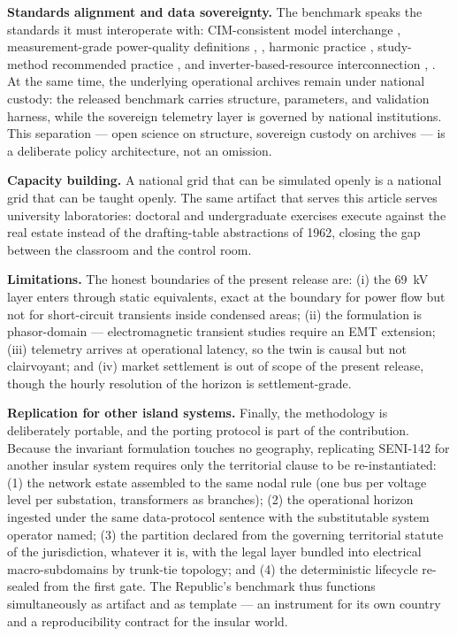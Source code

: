 \textbf{Standards alignment and data sovereignty.} The benchmark speaks the standards it must interoperate with: CIM-consistent model interchange \cite{iec61970}, measurement-grade power-quality definitions \cite{iec61000}, \cite{ieee1459}, harmonic practice \cite{ieee519}, study-method recommended practice \cite{ieee399}, and inverter-based-resource interconnection \cite{ieee2800}, \cite{ieee1547}. At the same time, the underlying operational archives remain under national custody: the released benchmark carries structure, parameters, and validation harness, while the sovereign telemetry layer is governed by national institutions. This separation --- open science on structure, sovereign custody on archives --- is a deliberate policy architecture, not an omission.

\textbf{Capacity building.} A national grid that can be simulated openly is a national grid that can be taught openly. The same artifact that serves this article serves university laboratories: doctoral and undergraduate exercises execute against the real estate instead of the drafting-table abstractions of 1962, closing the gap between the classroom and the control room.

\textbf{Limitations.} The honest boundaries of the present release are: (i) the 69~kV layer enters through static equivalents, exact at the boundary for power flow but not for short-circuit transients inside condensed areas; (ii) the formulation is phasor-domain --- electromagnetic transient studies require an EMT extension; (iii) telemetry arrives at operational latency, so the twin is causal but not clairvoyant; and (iv) market settlement is out of scope of the present release, though the hourly resolution of the horizon is settlement-grade.

\textbf{Replication for other island systems.} Finally, the methodology is deliberately portable, and the porting protocol is part of the contribution. Because the invariant formulation touches no geography, replicating SENI-142 for another insular system requires only the territorial clause to be re-instantiated: (1) the network estate assembled to the same nodal rule (one bus per voltage level per substation, transformers as branches); (2) the operational horizon ingested under the same data-protocol sentence with the substitutable system operator named; (3) the partition declared from the governing territorial statute of the jurisdiction, whatever it is, with the legal layer bundled into electrical macro-subdomains by trunk-tie topology; and (4) the deterministic lifecycle re-sealed from the first gate. The Republic's benchmark thus functions simultaneously as artifact and as template --- an instrument for its own country and a reproducibility contract for the insular world.
